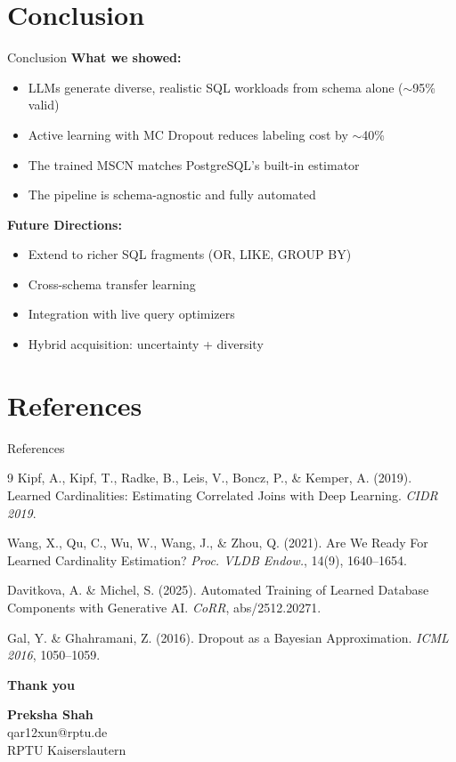 \documentclass[aspectratio=169]{beamer}
\begin{document}
	\section{Conclusion}
	
	\begin{frame}{Conclusion}
		\textbf{What we showed:}
		\begin{itemize}
			\item LLMs generate diverse, realistic SQL workloads from schema alone ($\sim$95\% valid)
			\item Active learning with MC Dropout reduces labeling cost by $\sim$40\%
			\item The trained MSCN matches PostgreSQL's built-in estimator
			\item The pipeline is schema-agnostic and fully automated
		\end{itemize}
		
		\vspace{0.5cm}
		
		\textbf{Future Directions:}
		\begin{itemize}
			\item Extend to richer SQL fragments (OR, LIKE, GROUP BY)
			\item Cross-schema transfer learning
			\item Integration with live query optimizers
			\item Hybrid acquisition: uncertainty + diversity
		\end{itemize}
	\end{frame}
	
	\section{References}
	
	\begin{frame}[allowframebreaks]{References}
		\begin{thebibliography}{9}
			Kipf, A., Kipf, T., Radke, B., Leis, V., Boncz, P., \& Kemper, A. (2019).
			\newblock Learned Cardinalities: Estimating Correlated Joins with Deep Learning.
			\newblock \emph{CIDR 2019}.
			
			Wang, X., Qu, C., Wu, W., Wang, J., \& Zhou, Q. (2021).
			\newblock Are We Ready For Learned Cardinality Estimation?
			\newblock \emph{Proc. VLDB Endow.}, 14(9), 1640--1654.
			
			Davitkova, A. \& Michel, S. (2025).
			\newblock Automated Training of Learned Database Components with Generative AI.
			\newblock \emph{CoRR}, abs/2512.20271.
			
			Gal, Y. \& Ghahramani, Z. (2016).
			\newblock Dropout as a Bayesian Approximation.
			\newblock \emph{ICML 2016}, 1050--1059.
		\end{thebibliography}
	\end{frame}
	
	\begin{frame}[plain]
		\centering
		\Huge \textbf{Thank you}
		
		\vspace{1cm}
		\normalsize
		\textbf{Preksha Shah} \\
		qar12xun@rptu.de \\
		RPTU Kaiserslautern
	\end{frame}
	
\end{document}
